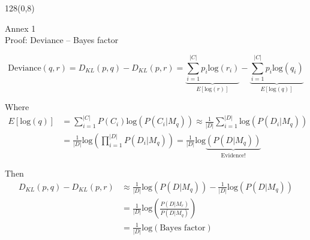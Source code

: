 \documentclass[shownotes]{beamer}
\begin{document}
\begin{frame}
\begin{textblock}{128}(0,8)
\begin{center}
Annex 1 \\ 
 \scriptsize Proof: Deviance -- Bayes factor
\end{center}
\end{textblock}
\vspace{0.5cm}


\tiny

\begin{equation}
\text{Deviance}(q,r) = D_{KL}(p,q) - D_{KL}(p,r) = \underbrace{\sum_{i=1}^{|C|} p_i \text{log}(r_i)}_{E[\text{log}(r)]} -\underbrace{\sum_{i=1}^{|C|} p_i \text{log}(q_i)}_{E[\text{log}(q)]}   
 \end{equation}

 
 \vspace{0.3cm}
 
 Where
 \begin{equation*}
\begin{align*}
 E[\text{log}(q)] & = \sum_{i=1}^{|C|} P(C_i) \text{log}(P(C_i|M_q))  \approx  \frac{1}{|D|} \sum_{i=1}^{|D|} \text{log}(P(D_i|M_q)) \\
 & = \frac{1}{|D|} \text{log}\left(\prod_{i=1}^{|D|} P(D_i|M_q)\right)= \frac{1}{|D|} \text{log}\underbrace{(P(D|M_q))}_{\text{Evidence!}}
\end{align*}
\end{equation*}

\vspace{0.3cm}

Then
\begin{equation*}
\begin{align*}
D_{KL}(p,q) - D_{KL}(p,r) & \approx \frac{1}{|D|} \text{log}(P(D|M_q)) - \frac{1}{|D|} \text{log}(P(D|M_q)) \\
& = \frac{1}{|D|} \text{log}\left(\frac{P(D|M_r)}{P(D|M_q)} \right) \\
& = \frac{1}{|D|} \text{log}\left(\text{Bayes factor}\right) 
\end{align*}
 \end{equation*}
 
\end{frame}
\end{document}
